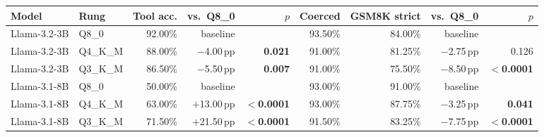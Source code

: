 \begin{tabular}{@{}llrrrrrrr@{}}
\toprule
Model & Rung & Tool acc. & vs.\ Q8\_0 & $p$ & Coerced & GSM8K strict & vs.\ Q8\_0 & $p$ \\
\midrule
Llama-3.2-3B & Q8\_0 & 92.00\% & baseline &  & 93.50\% & 84.00\% & baseline &  \\
Llama-3.2-3B & Q4\_K\_M & 88.00\% & $-$4.00\,pp & \textbf{0.021} & 91.00\% & 81.25\% & $-$2.75\,pp & 0.126 \\
Llama-3.2-3B & Q3\_K\_M & 86.50\% & $-$5.50\,pp & \textbf{0.007} & 91.00\% & 75.50\% & $-$8.50\,pp & \textbf{$<$0.0001} \\
\midrule
Llama-3.1-8B & Q8\_0 & 50.00\% & baseline &  & 93.00\% & 91.00\% & baseline &  \\
Llama-3.1-8B & Q4\_K\_M & 63.00\% & $+$13.00\,pp & \textbf{$<$0.0001} & 93.00\% & 87.75\% & $-$3.25\,pp & \textbf{0.041} \\
Llama-3.1-8B & Q3\_K\_M & 71.50\% & $+$21.50\,pp & \textbf{$<$0.0001} & 91.50\% & 83.25\% & $-$7.75\,pp & \textbf{$<$0.0001} \\
\bottomrule
\end{tabular}
